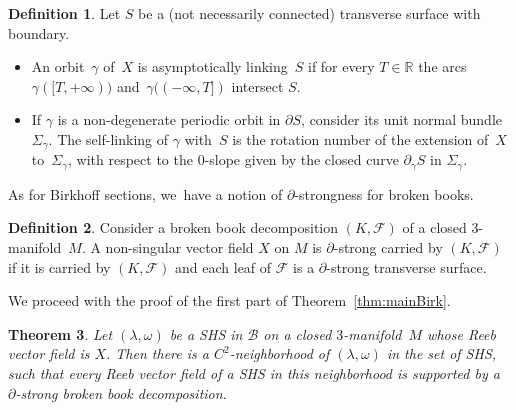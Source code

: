 \documentclass[11pt]{article}
\newcommand{\threemanifold}{$3$\nobreakdash-mani\-fold\xspace}
\newtheorem{theorem}{Theorem}[section]
\theoremstyle{definition}
\newtheorem{defi}[theorem]{Definition}
\newcommand\R{\mathbb{R}}
\begin{document}
\begin{defi}
Let $S$ be a (not necessarily connected)
transverse surface with boundary.
\begin{itemize}
\item
An orbit~$\gamma$ of~$X$ is asymptotically linking~$S$ if for every $T\in\R$ the arcs $\gamma([T, +\infty))$ and~$\gamma((-\infty, T])$ intersect $S$.

\item
If $\gamma$ is a non-degenerate periodic orbit in $\partial S$, consider its unit normal bundle~$\Sigma_\gamma$. The self-linking of $\gamma$ with~$S$ is the rotation number of the extension of~$X$ to~$\Sigma_\gamma$, with respect to the 0-slope given by the closed curve $\partial_\gamma S$ in $\Sigma_\gamma$.
\end{itemize}

\end{defi}

As for Birkhoff sections, we~have a notion of $\partial$-strongness for broken books.

\begin{defi}\label{defn-bbddelta}
Consider a broken book decomposition $(K,\mathcal{F})$ of a closed \threemanifold~$M$. A non-singular vector field $X$ on $M$ is $\partial$-strong carried by $(K,\mathcal{F})$ if it is carried by $(K,\mathcal{F})$ and each leaf of $\mathcal{F}$ is a $\partial$-strong transverse surface.
\end{defi}

We proceed with the proof of the first part of Theorem~\ref{thm:mainBirk}.

\begin{theorem}\label{thm:bbook}
Let $(\lambda,\omega)$ be a SHS in $\mathcal{B}$ on a closed \threemanifold~$M$ whose Reeb vector field is $X$. Then there is a $C^2$-neighborhood of $(\lambda,\omega)$ in the set of SHS, such that every Reeb vector field of a SHS in this neighborhood is supported by a $\partial$-strong broken book decomposition.
\end{theorem}
\end{document}
